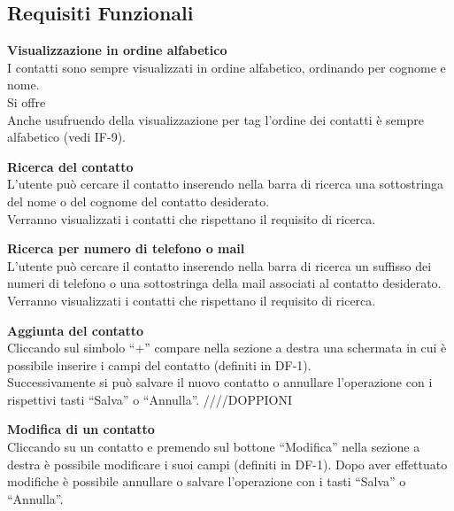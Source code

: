 \subsection{Requisiti Funzionali}
\newcommand{\IFitem}{\addtocounter{IFcounter}{1}IF-\theIFcounter}
	\begin{tcolorbox}[colback=white,colframe=black!80!white,title=\textbf{Funzionalità individuali IF}]
	\begin{itemize}[itemsep=2pt, topsep=0pt, label=\textbf{\IFitem}]
		\item \textbf{Visualizzazione in ordine alfabetico}
		\\I contatti sono sempre visualizzati in ordine alfabetico, ordinando per cognome e nome.
		\\Si offre
		\\Anche usufruendo della visualizzazione per tag l’ordine dei contatti è sempre alfabetico (vedi IF-9).
		
		\item \textbf{Ricerca del contatto}
		\\L’utente può cercare il contatto inserendo nella barra di ricerca una sottostringa del nome o del cognome del contatto desiderato.
		\\Verranno visualizzati i contatti che rispettano il requisito di ricerca.
		
		\item \textbf{Ricerca per numero di telefono o mail}
		\\L’utente può cercare il contatto inserendo nella barra di ricerca un suffisso dei numeri di telefono o una sottostringa della mail associati al contatto desiderato. 
		\\Verranno visualizzati i contatti che rispettano il requisito di ricerca. 
		
		\item \textbf{Aggiunta del contatto}
		\\Cliccando sul simbolo “+” compare nella sezione a destra una
		schermata in cui è possibile inserire i campi del contatto (definiti in 
		DF-1).
		\\Successivamente si può salvare il nuovo contatto o annullare  
		l’operazione con i rispettivi tasti “Salva” o “Annulla”.
		////DOPPIONI
		
		\item \textbf{Modifica di un contatto}
		\\Cliccando su un contatto e premendo sul bottone “Modifica” nella sezione a destra è possibile modificare i suoi campi (definiti in DF-1). Dopo aver effettuato modifiche è possibile annullare o salvare l’operazione con i tasti “Salva” o “Annulla”.
		

\end{itemize}
\end{tcolorbox}
